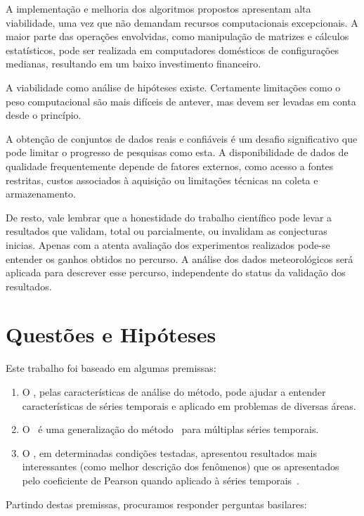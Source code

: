 A implementação e melhoria dos algoritmos propostos apresentam alta viabilidade, uma vez que não demandam recursos computacionais excepcionais. A maior parte das operações envolvidas, como manipulação de matrizes e cálculos estatísticos, pode ser realizada em computadores domésticos de configurações medianas, resultando em um baixo investimento financeiro.

A viabilidade como análise de hipóteses existe. Certamente limitações como o peso computacional são mais difíceis de antever, mas devem ser levadas em
conta desde o princípio.

A obtenção de conjuntos de dados reais e confiáveis é um desafio significativo que pode limitar o progresso de pesquisas como esta. A disponibilidade de dados de qualidade frequentemente depende de fatores externos, como acesso a fontes restritas, custos associados à aquisição ou limitações técnicas na coleta e armazenamento.

De resto, vale lembrar que a honestidade do trabalho científico pode levar a resultados que validam, total ou parcialmente, ou invalidam as conjecturas inicias. Apenas com a atenta avaliação dos experimentos realizados pode-se entender os ganhos obtidos no percurso. A análise dos dados meteorológicos será aplicada para descrever esse percurso, independente do status da validação dos resultados.


\section{Questões e Hipóteses}
\label{sec:questoes}

Este trabalho foi baseado em algumas premissas:

\begin{enumerate}
    \label{enum:premissas}

    \item O \dmc, pelas características de análise do método, pode ajudar a entender características de séries temporais e aplicado em problemas de diversas áreas.
    \item O \dmc~é uma generalização do método \pdcca~para múltiplas séries temporais.
	\item O \pdcca, em determinadas condições testadas, apresentou resultados mais interessantes (como melhor descrição dos fenômenos) que os apresentados pelo coeficiente de Pearson quando aplicado à séries temporais~\cite{Wang2013}. 
\end{enumerate}

Partindo destas premissas, procuramos responder perguntas basilares:


